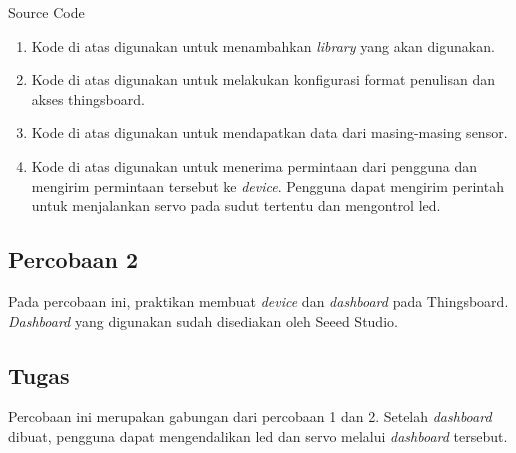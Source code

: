 \documentclass{class}
\begin{document}
  Source Code
    \begin{enumerate}
      \item 
      Kode di atas digunakan untuk menambahkan \emph{library} yang akan digunakan. \\
      \item 
      Kode di atas digunakan untuk melakukan konfigurasi format penulisan dan akses thingsboard. \\
      \item 
      Kode di atas digunakan untuk mendapatkan data dari masing-masing sensor. \\
      \item 
      Kode di atas digunakan untuk menerima permintaan dari pengguna dan mengirim permintaan tersebut ke \emph{device}.
      Pengguna dapat mengirim perintah untuk menjalankan servo pada sudut tertentu dan mengontrol led. \\
    \end{enumerate}
  \subsection{Percobaan 2}
  Pada percobaan ini, praktikan membuat \emph{device} dan \emph{dashboard} pada Thingsboard.
  \emph{Dashboard} yang digunakan sudah disediakan oleh Seeed Studio.
  \subsection{Tugas}
  Percobaan ini merupakan gabungan dari percobaan 1 dan 2.
  Setelah \emph{dashboard} dibuat, pengguna dapat mengendalikan led dan servo melalui \emph{dashboard} tersebut.
  
\end{document}
